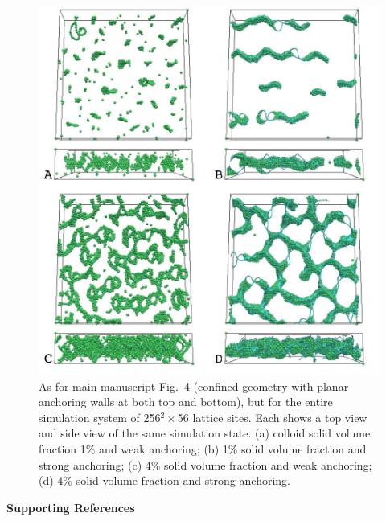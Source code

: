 \documentclass[12pt,twoside]{article}
\begin{document}
\begin{figure}
\begin{center}
\includegraphics[scale=0.42]{s4.jpg}
\end{center}
\caption{As for main manuscript Fig.~4 (confined geometry with planar
anchoring walls at both top and bottom), but for the entire simulation
system of 256$^2\times$56 lattice sites. Each shows a top view and
side view of the same simulation state. (a) colloid solid volume fraction 1\%
and weak anchoring; (b) 1\% solid volume fraction and strong anchoring;
(c) 4\% solid volume fraction and weak anchoring; (d) 4\% solid
volume fraction and strong anchoring.}
\end{figure}



\newpage

{\bf Supporting References}
\end{document}
